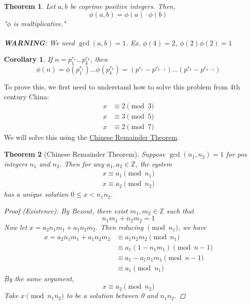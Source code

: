 \documentclass[letterpaper]{article}
\newcommand{\ZZ}{\mathbb{Z}}
\newtheorem{theorem}{Theorem}[subsection]
\newtheorem{corollary}{Corollary}[subsection]
\begin{document}
        \begin{theorem}
            Let $a,b$ be coprime positive integers. Then,
            \[ \phi(a,b)=\phi(a)\cdot\phi(b) \]
            "$\phi$ is multiplicative." \\\\
            \textbf{WARNING}: We need $\gcd(a,b)=1$.
            Ex. $\phi(4)=2$, $\phi(2)\phi(2)=1$
        \end{theorem}

        \begin{corollary}
            If $n=p_1^{r_1}\dots p_k^{r_k}$, then
            \[ 
                \phi(n) = \phi(p_1^{r_1})\dots\phi(p_k^{r_k})
                = (p^{r_1}-p^{r_{k-1}})\dots(p^{r_k}-p^{r_{k-1}})
            \]
        \end{corollary}

        To prove this, we first need to understand how to solve this 
        problem from 4th century China: 
        \begin{align*}
            x &\equiv 2\pmod{3} \\
            x &\equiv 3\pmod{5} \\
            x &\equiv 2\pmod{7}
        \end{align*}
        We will solve this using the \underline{Chinese Remainder Theorem}.

        \begin{theorem} [Chinese Remainder Theorem]
            Suppose $\gcd(n_1,n_2)=1$ for pos integers $n_1$ and $n_2$. 
            Then for any $a_1,a_2\in\ZZ$, the system
            \begin{align*}
                x\equiv a_1\pmod{n_1} \\
                x\equiv a_2\pmod{n_2}
            \end{align*} 
            has a unique solution $0\le x<n_1n_2$.

            \begin{proof} [Proof (Existence)]
                By Bezout, there exist $m_1,m_2\in\ZZ$ such that
                \[ n_1m_1+n_2m_2 = 1 \]
                Now let $x=a_2n_1m_1+a_1n_2m_2$.
                Then reducing $\pmod{n_1}$, we have
                \begin{align*}
                    x=a_2n_1m_1+a_1n_2m_2 &\equiv a_1n_2m_2\pmod{n_1} \\
                    &\equiv a_1(1-n_1m_1)\pmod{n-1} \\
                    &\equiv a_1-a_1n_1m_1\pmod{n-1} \\
                    &\equiv a_1\pmod{n_1}
                \end{align*}
                By the same argument, 
                \[ x\equiv a_2\pmod{n_2} \]
                Take $x\pmod{n_1n_2}$ to be a solution between 0 and $n_1n_2$.
            \end{proof}
        \end{theorem}
\end{document}
